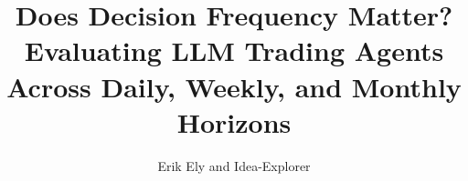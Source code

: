 \documentclass{article}
\title{Does Decision Frequency Matter? Evaluating LLM Trading Agents\\Across Daily, Weekly, and Monthly Horizons}
\author{Erik Ely and Idea-Explorer}
\begin{document}
\maketitle

\begin{abstract}

\end{abstract}










\end{document}
